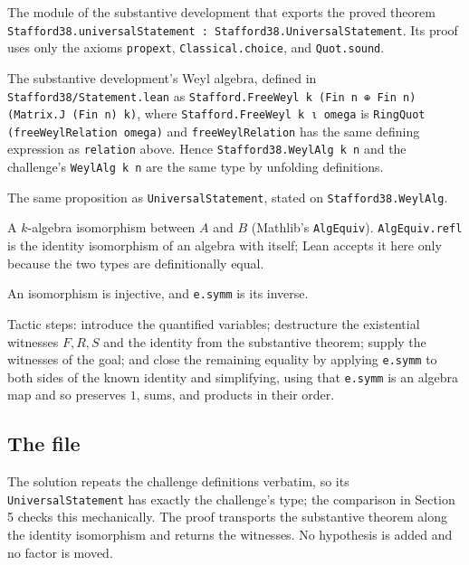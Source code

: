 \documentclass[11pt,a4paper]{article}
\theoremstyle{definition}
\theoremstyle{plain}
\newcommand{\lean}[1]{\texttt{#1}}
\begin{document}
\begin{description}\sloppy
\item[\lean{Stafford38.FoundationClosure}] The module of the substantive
  development that exports the proved theorem
  \lean{Stafford38.universalStatement : Stafford38.UniversalStatement}. Its
  proof uses only the axioms \lean{propext}, \lean{Classical.choice}, and
  \lean{Quot.sound}.
\item[\lean{Stafford38.WeylAlg k n}] The substantive development's Weyl
  algebra, defined in \lean{Stafford38/Statement.lean} as
  \lean{Stafford.FreeWeyl k (Fin n ⊕ Fin n) (Matrix.J (Fin n) k)}, where
  \lean{Stafford.FreeWeyl k ι omega} is
  \lean{RingQuot (freeWeylRelation omega)} and \lean{freeWeylRelation} has the
  same defining expression as \lean{relation} above. Hence
  \lean{Stafford38.WeylAlg k n} and the challenge's \lean{WeylAlg k n} are the
  same type by unfolding definitions.
\item[\lean{Stafford38.UniversalStatement}] The same proposition as
  \lean{UniversalStatement}, stated on \lean{Stafford38.WeylAlg}.
\item[\lean{A ≃ₐ[k] B}] A $k$-algebra isomorphism between $A$ and $B$
  (Mathlib's \lean{AlgEquiv}). \lean{AlgEquiv.refl} is the identity
  isomorphism of an algebra with itself; Lean accepts it here only because the
  two types are definitionally equal.
\item[\lean{e.injective}, \lean{e.symm}] An isomorphism is injective, and
  \lean{e.symm} is its inverse.
\item[\lean{intro}, \lean{rcases}, \lean{refine}, \lean{simpa}, \lean{congrArg}]
  Tactic steps: introduce the quantified variables; destructure the existential
  witnesses $F,R,S$ and the identity from the substantive theorem; supply the
  witnesses of the goal; and close the remaining equality by applying
  \lean{e.symm} to both sides of the known identity and simplifying, using that
  \lean{e.symm} is an algebra map and so preserves $1$, sums, and products in
  their order.
\end{description}

\subsection{The file}


\begin{sloppypar}
The solution repeats the challenge definitions verbatim, so its
\lean{UniversalStatement} has exactly the challenge's type; the comparison in
Section 5 checks this mechanically. The proof transports the substantive
theorem along the identity isomorphism and returns the witnesses. No
hypothesis is added and no factor is moved.
\end{sloppypar}
\end{document}

